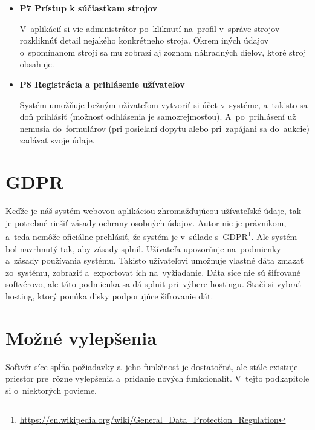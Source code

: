 \begin{itemize}
\item \textbf{P7 Prístup k súčiastkam strojov}

V~aplikácií si vie administrátor po~kliknutí na~profil v~správe strojov rozkliknúť detail nejakého konkrétneho stroja. Okrem iných údajov o~spomínanom stroji sa mu zobrazí aj zoznam náhradných dielov, ktoré stroj obsahuje.

\item \textbf{P8 Registrácia a prihlásenie užívateľov}

Systém umožňuje bežným užívateľom vytvoriť si účet v~systéme, a~takisto sa doň prihlásiť (možnosť odhlásenia je samozrejmosťou). A~po~prihlásení už nemusia do~formulárov (pri posielaní dopytu alebo pri~zapájani sa do~aukcie) zadávať svoje údaje.
\end{itemize}

\section{GDPR}

Keďže je náš systém webovou aplikáciou zhromažďujúcou užívateľské údaje, tak je potrebné riešiť zásady ochrany osobných údajov. Autor nie je právnikom, a~teda nemôže oficiálne prehlásiť, že systém je v~súlade s~GDPR\footnote{\url{https://en.wikipedia.org/wiki/General_Data_Protection_Regulation}}. Ale systém bol navrhnutý tak, aby zásady splnil. Užívateľa upozorňuje na~podmienky a~zásady používania systému. Takisto užívateľovi umožnuje vlastné dáta zmazať zo~systému, zobraziť a~exportovať ich na~vyžiadanie. Dáta síce nie sú šifrované softvérovo, ale táto podmienka sa dá splniť pri~výbere hostingu. Stačí si vybrať hosting, ktorý ponúka disky podporujúce šifrovanie dát.

\section{Možné vylepšenia}

Softvér síce spĺňa požiadavky a~jeho funkčnosť je dostatočná, ale stále existuje priestor pre~rôzne vylepšenia a~pridanie nových funkcionalít. V~tejto podkapitole si o~niektorých povieme.

